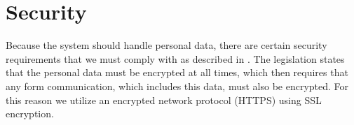 
\chapter{Security}
\label{cha:security}

Because the system should handle personal data, there are certain security requirements that we must comply with as described in . The legislation states that the personal data must be encrypted at all times, which then requires that any form communication, which includes this data, must also be encrypted. For this reason we utilize an encrypted network protocol (HTTPS) using SSL encryption.






